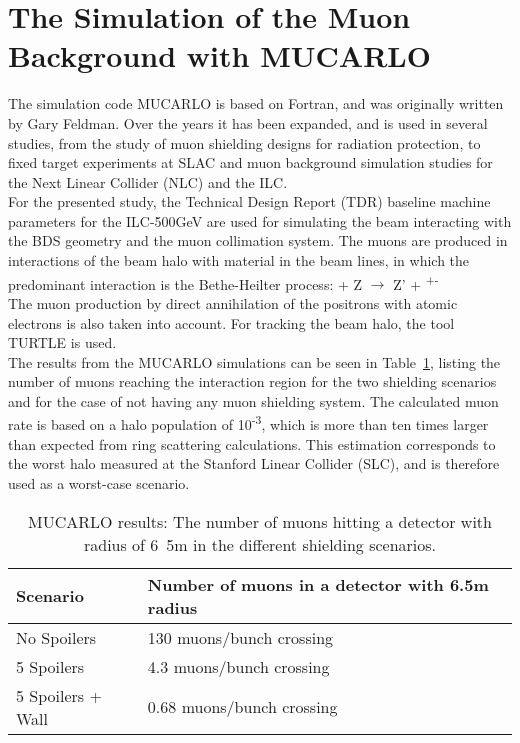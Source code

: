 \section{The Simulation of the Muon Background with MUCARLO}
\label{MUCARLO}

The simulation code MUCARLO is based on Fortran, and was originally written by Gary Feldman.
Over the years it has been expanded, and is used in several studies, from the study of muon shielding designs for radiation protection, to fixed target experiments at SLAC and muon background simulation studies for the Next Linear Collider (NLC) and the ILC.\cite{MuonBkg_05TeV, MuonBkg_1TeV}\\
For the presented study, the Technical Design Report (TDR) baseline machine parameters for the ILC-500GeV are used for simulating the beam interacting with the BDS geometry and the muon collimation system.
The muons are produced in interactions of the beam halo with material in the beam lines, in which the predominant interaction is the Bethe-Heilter process:
\textgamma + Z $\rightarrow$ Z' + \murm\textsuperscript{+}\murm\textsuperscript{-}\\
The muon production by direct annihilation of the positrons with atomic electrons is also taken into account.\cite[sec. 2]{Mucarlo}
For tracking the beam halo, the tool TURTLE\cite{Turtle} is used.\\
The results from the MUCARLO simulations can be seen in Table~\ref{tab:MuonRates}, listing the number of muons reaching the interaction region for the two shielding scenarios and for the case of not having any muon shielding system.
The calculated muon rate is based on a halo population of 10\textsuperscript{-3}, which is more than ten times larger than expected from ring scattering calculations.
This estimation corresponds to the worst halo measured at the Stanford Linear Collider (SLC), and is therefore used as a worst-case scenario.

\begin{table}
\caption{MUCARLO results: The number of muons hitting a detector with radius of \unit{6.5}{m} in the different shielding scenarios.}
\label{tab:MuonRates}
\centering
\begin{tabularx}{\textwidth}{ll}
\hline\hline
\textbf{Scenario} & \textbf{Number of muons in a detector with 6.5m radius}\\
\hline
\cline{1-2}
\hline
 No Spoilers & 130 muons/bunch crossing\\
 5 Spoilers& 4.3 muons/bunch crossing\\
 5 Spoilers + Wall & 0.68 muons/bunch crossing\\
\hline\hline
\end{tabularx}
\end{table}
